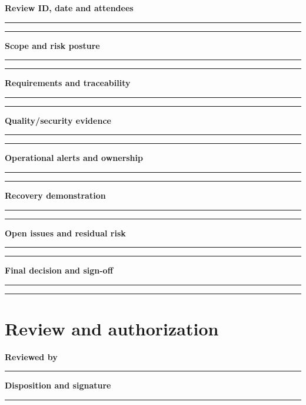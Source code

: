 \documentclass[10pt,letterpaper]{article}
\begin{document}
\textbf{Review ID, date and attendees}\par
\noindent\rule{\linewidth}{0.35pt}\par\vspace{0.7em}
\noindent\rule{\linewidth}{0.35pt}\par\vspace{0.7em}
\textbf{Scope and risk posture}\par
\noindent\rule{\linewidth}{0.35pt}\par\vspace{0.7em}
\noindent\rule{\linewidth}{0.35pt}\par\vspace{0.7em}
\textbf{Requirements and traceability}\par
\noindent\rule{\linewidth}{0.35pt}\par\vspace{0.7em}
\noindent\rule{\linewidth}{0.35pt}\par\vspace{0.7em}
\textbf{Quality/security evidence}\par
\noindent\rule{\linewidth}{0.35pt}\par\vspace{0.7em}
\noindent\rule{\linewidth}{0.35pt}\par\vspace{0.7em}
\textbf{Operational alerts and ownership}\par
\noindent\rule{\linewidth}{0.35pt}\par\vspace{0.7em}
\noindent\rule{\linewidth}{0.35pt}\par\vspace{0.7em}
\textbf{Recovery demonstration}\par
\noindent\rule{\linewidth}{0.35pt}\par\vspace{0.7em}
\noindent\rule{\linewidth}{0.35pt}\par\vspace{0.7em}
\textbf{Open issues and residual risk}\par
\noindent\rule{\linewidth}{0.35pt}\par\vspace{0.7em}
\noindent\rule{\linewidth}{0.35pt}\par\vspace{0.7em}
\textbf{Final decision and sign-off}\par
\noindent\rule{\linewidth}{0.35pt}\par\vspace{0.7em}
\noindent\rule{\linewidth}{0.35pt}\par\vspace{0.7em}
\section{Review and authorization}
\textbf{Reviewed by}\par
\noindent\rule{\linewidth}{0.35pt}\par\vspace{0.7em}
\textbf{Disposition and signature}\par
\noindent\rule{\linewidth}{0.35pt}\par\vspace{0.7em}
\end{document}
